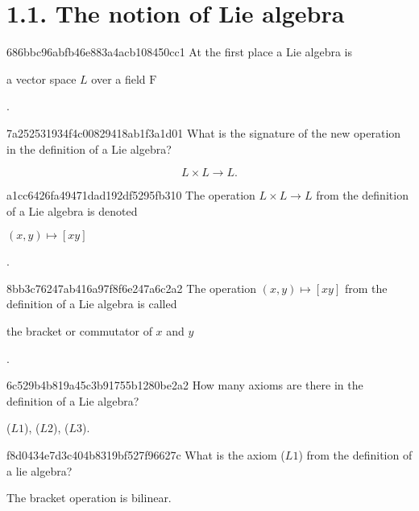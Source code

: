 \section{1.1. The notion of Lie algebra}
\begin{note}{686bbc96abfb46e883a4acb108450cc1}
    At the first place a Lie algebra is \begin{icloze}{1}a vector space \( L \)
    over a field \( \mathrm F \)\end{icloze}.
\end{note}

\begin{note}{7a252531934f4c00829418ab1f3a1d01}
    What is the signature of the new operation in the definition of a Lie
    algebra?

    \begin{cloze}{1}
        \[
            L \times L \to L.
        \]
    \end{cloze}
\end{note}

\begin{note}{a1cc6426fa49471dad192df5295fb310}
    The operation \( L \times L \to L \) from the definition of a Lie algebra is
    denoted \begin{icloze}{1}\( (x, y) \mapsto [xy] \)\end{icloze}.
\end{note}

\begin{note}{8bb3c76247ab416a97f8f6e247a6c2a2}
    The operation \( (x, y) \mapsto [xy] \)  from the definition of a Lie
    algebra is called \begin{icloze}{1}the bracket or commutator of \( x \) and
    \( y \)\end{icloze}.
\end{note}

\begin{note}{6c529b4b819a45c3b91755b1280be2a2}
    How many axioms are there in the definition of a Lie algebra?

    \begin{cloze}{1}
        (\( L 1 \)), (\( L 2 \)), (\( L 3 \)).
    \end{cloze}
\end{note}

\begin{note}{f8d0434e7d3c404b8319bf527f96627c}
    What is the axiom (\( L 1 \)) from the definition of a lie algebra?

    \begin{cloze}{1}
        The bracket operation is bilinear.
    \end{cloze}
\end{note}

